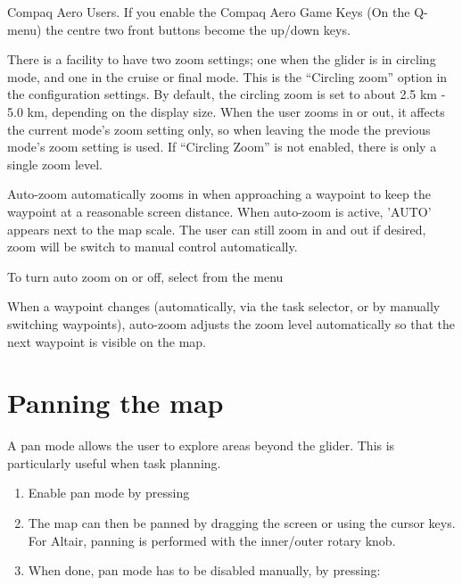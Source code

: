 Compaq Aero Users. If you enable the Compaq Aero Game Keys (On the
Q-menu) the centre two front buttons become the up/down keys.

There is a facility to have two zoom settings; one when the glider is
in circling mode, and one in the cruise or final mode.  This is the ``Circling
zoom'' option in the  configuration settings.  
By default, the circling zoom is set to about 2.5 km - 5.0 km, depending on the
display size. When the user zooms in or out, it affects the current
mode's zoom setting only, so when leaving the mode the previous mode's
zoom setting is used.  If ``Circling Zoom'' is not enabled,
there is only a single zoom level.

Auto-zoom automatically zooms in when approaching a waypoint to keep
the waypoint at a reasonable screen distance. When auto-zoom is active,
'AUTO' appears next to the map scale. The user can still zoom
in and out if desired, zoom will be switch to manual control automatically.

To turn auto zoom on or off, select from the menu
\begin{quote}
\blink{}\blink{} 
\end{quote}

When a waypoint changes (automatically, via the task selector, or by
manually switching waypoints), auto-zoom adjusts the zoom level
automatically so that the next waypoint is visible on the map.


\section{Panning the map}

A pan mode allows the user to explore areas beyond the glider.  This
is particularly useful when task planning.
\begin{enumerate}
\item Enable pan mode by pressing 
\begin{quote}
\blink{}
\end{quote}

\item The map can then be panned by dragging the screen or using the cursor
  keys.  For Altair, panning is performed with the inner/outer rotary knob.
\item When done, pan mode has to be disabled manually, by pressing:
\begin{quote}
\end{quote}

\end{enumerate} 

